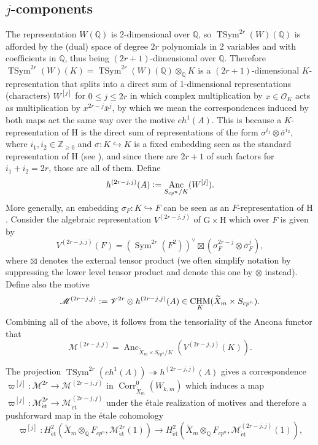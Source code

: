\documentclass[a4paper]{amsart}
\numberwithin{equation}{section}
\theoremstyle{definition}
\newcommand{\Q}{\mathbb{Q}}
\newcommand{\Z}{\mathbb{Z}}
\newcommand{\defeq}{\vcentcolon=}
\DeclareMathOperator{\et}{\text{\'et}}
\DeclareMathOperator{\TSym}{TSym}
\DeclareMathOperator{\Sym}{Sym}
\DeclareMathOperator{\Corr}{Corr}
\DeclareMathOperator{\CHM}{CHM}
\DeclareMathOperator{\Anc}{Anc}
\newcommand{\boldG}{\boldsymbol{\mathrm{G}}}
\newcommand{\boldH}{\boldsymbol{\mathrm{H}}}
\renewcommand{\et}{\mathrm{\acute{e}t}}
\begin{document}
\subsection{$j$-components}\label{subsec.jComponents}
The representation $W(\Q)$ is 2-dimensional over $\Q$, so $\TSym^{2r}(W)(\Q)$ is afforded by the (dual) space of degree $2r$ polynomials in 2 variables and with coefficients in $\Q$, thus being $(2r+1)$-dimensional over $\Q$. Therefore $\TSym^{2r}(W)(K)=\TSym^{2r}(W)(\Q)\otimes_{\Q}K$ is a $(2r+1)$-dimensional $K$-representation that splits into a direct sum of 1-dimensional representations (characters) $W^{[j]}$ for $0\le j\le 2r$ in which complex multiplication by $x\in\mathcal{O}_K$ acts as multiplication by $x^{2r-j}\bar{x}^j$, by which we mean the correspondences induced by both maps act the same way over the motive $eh^1(A)$. This is because a $K$-representation of $\boldH$ is the direct sum of representations of the form $\sigma^{i_1}\otimes\bar{\sigma}^{i_2}$, where $i_1,i_2\in\Z_{\ge 0}$ and $\sigma\colon K\hookrightarrow K$ is a fixed embedding seen as the standard representation of $\boldH$ (see \cite[Remarque 4.8]{Ancona.Thesis}), and since there are $2r+1$ of such factors for $i_1+i_2=2r$, those are all of them. Define \[h^{(2r-j,j)}(A)\defeq\Anc_{S_{cp^n}/K}(W^{[j]}).\]
More generally, an embedding $\sigma_F\colon K\hookrightarrow F$ can be seen as an $F$-representation of $\boldH$. Consider the algebraic representation $V^{(2r-j,j)}$ of $\boldG\times\boldH$ which over $F$ is given by \[V^{(2r-j,j)}(F)=\left(\Sym^{2r}(F^2)\right)^\vee\boxtimes\left(\sigma_F^{2r-j}\otimes\bar{\sigma}_F^{j}\right),\]
where $\boxtimes$ denotes the external tensor product (we often simplify notation by suppressing the lower level tensor product and denote this one by $\otimes$ instead). Define also the motive \[\mathscr{M}^{(2r-j,j)}\defeq \mathscr{V}^{2r}\otimes h^{(2r-j,j)}(A)\in\CHM_K(\widetilde{X}_m\times S_{cp^n}).\] Combining all of the above, it follows from the tensoriality of the Ancona functor that \[\mathscr{M}^{(2r-j,j)}=\Anc_{\widetilde{X}_m\times S_{cp^n}/K}\left(V^{(2r-j,j)}(K)\right).\]

The projection $\operatorname{TSym}^{2r}(eh^1(A))\twoheadrightarrow h^{(2r-j,j)}(A)$ gives a correspondence $\varpi^{[j]}\colon\mathscr{M}^{2r}\to\mathscr{M}^{(2r-j,j)}$ in $\Corr^0_{\widetilde{X}_m}(W_{k,m})$ which induces a map $\varpi^{[j]}\colon\mathscr{M}_{\et}^{2r}\to\mathscr{M}^{(2r-j,j)}_{\et}$ under the étale realization of motives and therefore a pushforward map in the étale cohomology
\begin{equation}\label{eq.jComponentMap}
\varpi^{[j]}\colon H^2_{\et}\left(\widetilde{X}_m\otimes_\Q F_{cp^n},\mathscr{M}_{\et}^{2r}(1)\right)\longrightarrow H^2_{\et}\left(\widetilde{X}_m\otimes_\Q F_{cp^n},\mathscr{M}^{(2r-j,j)}_{\et}(1)\right),
\end{equation}
\end{document}
